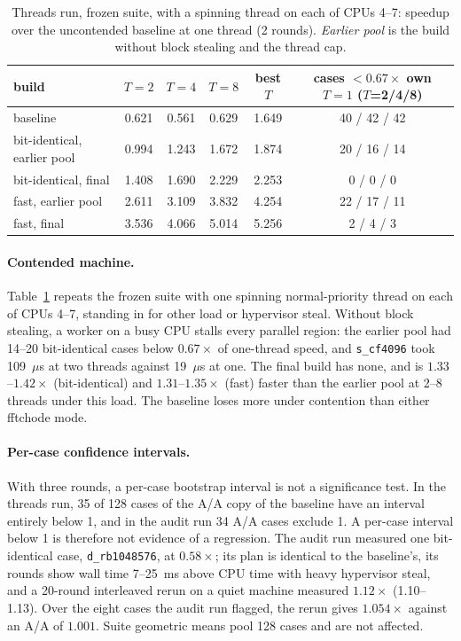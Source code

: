 \documentclass[10pt]{article}
\theoremstyle{definition}
\begin{document}
\begin{table}[t]
\centering\small
\begin{tabular}{lccccc}
\toprule
build & $T=2$ & $T=4$ & $T=8$ & best $T$ & cases $<0.67\times$ own $T=1$ ($T$=2/4/8)\\
\midrule
baseline & 0.621 & 0.561 & 0.629 & 1.649 & 40 / 42 / 42\\
bit-identical, earlier pool & 0.994 & 1.243 & 1.672 & 1.874 & 20 / 16 / 14\\
bit-identical, final & 1.408 & 1.690 & 2.229 & 2.253 & 0 / 0 / 0\\
fast, earlier pool & 2.611 & 3.109 & 3.832 & 4.254 & 22 / 17 / 11\\
fast, final & 3.536 & 4.066 & 5.014 & 5.256 & 2 / 4 / 3\\
\bottomrule
\end{tabular}
\caption{Threads run, frozen suite, with a spinning thread on each of CPUs 4--7: speedup over the uncontended baseline at one thread (2 rounds). \emph{Earlier pool} is the build without block stealing and the thread cap.}\label{tab:hog}
\end{table}

\paragraph{Contended machine.} Table~\ref{tab:hog} repeats the frozen suite with one spinning normal-priority thread on each of CPUs 4--7, standing in for other load or hypervisor steal. Without block stealing, a worker on a busy CPU stalls every parallel region: the earlier pool had 14--20 bit-identical cases below $0.67\times$ of one-thread speed, and \texttt{s\_cf4096} took 109~$\mu$s at two threads against 19~$\mu$s at one. The final build has none, and is $1.33$--$1.42\times$ (bit-identical) and $1.31$--$1.35\times$ (fast) faster than the earlier pool at 2--8 threads under this load. The baseline loses more under contention than either fftchode mode.

\paragraph{Per-case confidence intervals.} With three rounds, a per-case bootstrap interval is not a significance test. In the threads run, 35 of 128 cases of the A/A copy of the baseline have an interval entirely below 1, and in the audit run 34 A/A cases exclude 1. A per-case interval below 1 is therefore not evidence of a regression. The audit run measured one bit-identical case, \texttt{d\_rb1048576}, at $0.58\times$; its plan is identical to the baseline's, its rounds show wall time 7--25~ms above CPU time with heavy hypervisor steal, and a 20-round interleaved rerun on a quiet machine measured $1.12\times$ (1.10--1.13). Over the eight cases the audit run flagged, the rerun gives $1.054\times$ against an A/A of $1.001$. Suite geometric means pool 128 cases and are not affected.
\end{document}
